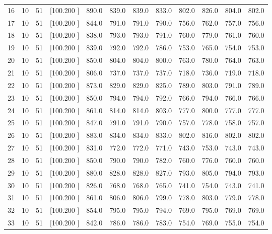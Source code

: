 \documentclass[12pt,a4paper]{article}
\begin{document}
\begin{center}
{\begin{tabular}{r r r r r r r r r r r r}
  16& 10& 51&[100.200   ]&   890.0&   839.0&   839.0&   833.0&   802.0&   826.0&   804.0&   802.0\\[-0.02in]
  17& 10& 51&[100.200   ]&   844.0&   791.0&   791.0&   790.0&   756.0&   762.0&   757.0&   756.0\\[-0.02in]
  18& 10& 51&[100.200   ]&   838.0&   793.0&   793.0&   791.0&   760.0&   779.0&   761.0&   760.0\\[-0.02in]
  19& 10& 51&[100.200   ]&   839.0&   792.0&   792.0&   786.0&   753.0&   765.0&   754.0&   753.0\\[-0.02in]
  20& 10& 51&[100.200   ]&   850.0&   804.0&   804.0&   800.0&   763.0&   780.0&   764.0&   763.0\\[-0.02in]
  21& 10& 51&[100.200   ]&   806.0&   737.0&   737.0&   737.0&   718.0&   736.0&   719.0&   718.0\\[-0.02in]
  22& 10& 51&[100.200   ]&   873.0&   829.0&   829.0&   825.0&   789.0&   803.0&   791.0&   789.0\\[-0.02in]
  23& 10& 51&[100.200   ]&   850.0&   794.0&   794.0&   792.0&   766.0&   794.0&   766.0&   766.0\\[-0.02in]
  24& 10& 51&[100.200   ]&   861.0&   814.0&   814.0&   803.0&   777.0&   800.0&   777.0&   777.0\\[-0.02in]
  25& 10& 51&[100.200   ]&   847.0&   791.0&   791.0&   790.0&   757.0&   778.0&   758.0&   757.0\\[-0.02in]
  26& 10& 51&[100.200   ]&   883.0&   834.0&   834.0&   833.0&   802.0&   816.0&   802.0&   802.0\\[-0.02in]
  27& 10& 51&[100.200   ]&   831.0&   772.0&   772.0&   771.0&   743.0&   753.0&   743.0&   743.0\\[-0.02in]
  28& 10& 51&[100.200   ]&   850.0&   790.0&   790.0&   782.0&   760.0&   776.0&   760.0&   760.0\\[-0.02in]
  29& 10& 51&[100.200   ]&   880.0&   828.0&   828.0&   827.0&   793.0&   805.0&   794.0&   793.0\\[-0.02in]
  30& 10& 51&[100.200   ]&   826.0&   768.0&   768.0&   765.0&   741.0&   754.0&   743.0&   741.0\\[-0.02in]
  31& 10& 51&[100.200   ]&   861.0&   806.0&   806.0&   799.0&   778.0&   803.0&   779.0&   778.0\\[-0.02in]
  32& 10& 51&[100.200   ]&   854.0&   795.0&   795.0&   794.0&   769.0&   795.0&   769.0&   769.0\\[-0.02in]
  33& 10& 51&[100.200   ]&   842.0&   786.0&   786.0&   783.0&   754.0&   769.0&   755.0&   754.0\\[-0.02in]

\end{tabular}}
\end{center}
\end{document}
